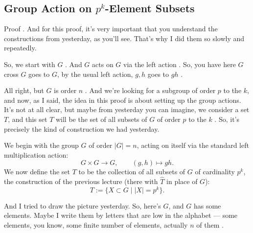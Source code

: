 \begin{proofWrapper}

\subsection{Group Action on \texorpdfstring{$p^k$}{p\textasciicircum k}-Element Subsets}

\begin{speech}[00:03:00 - 00:04:17]
Proof . And for this proof, it's very important that you understand the constructions from yesterday, as you'll see. That's why I did them so slowly and repeatedly.

So, we start with $G$ . And $G$ acts on $G$ via the left action . So, you have here $G$ cross $G$ goes to $G$, by the usual left action, $g, h$ goes to $g h$ .

All right, but $G$ is order $n$ . And we're looking for a subgroup of order $p$ to the $k$, and now, as I said, the idea in this proof is about setting up the group actions. It's not at all clear, but maybe from yesterday you can imagine, we consider a set $T$, and this set $T$ will be the set of all subsets of $G$ of order $p$ to the $k$ . So, it's precisely the kind of construction we had yesterday.
\end{speech}

\begin{content}
We begin with the group $G$ of order $|G| = n$, acting on itself via the standard left multiplication action:
\[
G \times G \to G, \qquad (g, h) \mapsto g h.
\]
We now define the set $T$ to be the collection of all subsets of $G$ of cardinality $p^k$, the construction of the previous lecture (there with $\widehat{T}$ in place of $G$):
\begin{equation}\label{eq:def-set-T}
T := \bigl\{ X \subset G \;\big|\; |X| = p^k \bigr\}.
\end{equation}
\end{content}

\begin{speech}[00:04:17 - 00:05:45]
And I tried to draw the picture yesterday. So, here's $G$, and $G$ has some elements. Maybe I write them by letters that are low in the alphabet --- some elements, you know, some finite number of elements, actually $n$ of them .


\end{speech}
\end{proofWrapper}
